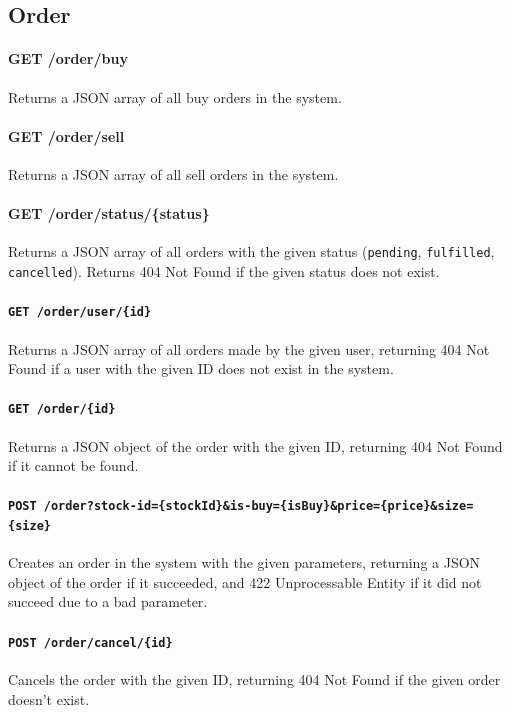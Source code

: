 \documentclass{article}
\begin{document}
\subsection{Order}

\paragraph{GET /order/buy} Returns a JSON array of all buy orders in the system.

\paragraph{GET /order/sell} Returns a JSON array of all sell orders in the system.

\paragraph{GET /order/status/\{status\}} Returns a JSON array of all orders with the given status (\texttt{pending}, \texttt{fulfilled}, \texttt{cancelled}). Returns 404 Not Found if the given status does not exist.

\paragraph{\texttt{GET /order/user/\{id\}}} Returns a JSON array of all orders made by the given user, returning 404 Not Found if a user with the given ID does not exist in the system.

\paragraph{\texttt{GET /order/\{id\}}} Returns a JSON object of the order with the given ID, returning 404 Not Found if it cannot be found.

\paragraph{\texttt{POST /order?stock-id=\{stockId\}\&is-buy=\{isBuy\}\&price=\{price\}\&size=\{size\}}} Creates an order in the system with the given parameters, returning a JSON object of the order if it succeeded, and 422 Unprocessable Entity if it did not succeed due to a bad parameter.

\paragraph{\texttt{POST /order/cancel/\{id\}}} Cancels the order with the given ID, returning 404 Not Found if the given order doesn't exist.
\end{document}
